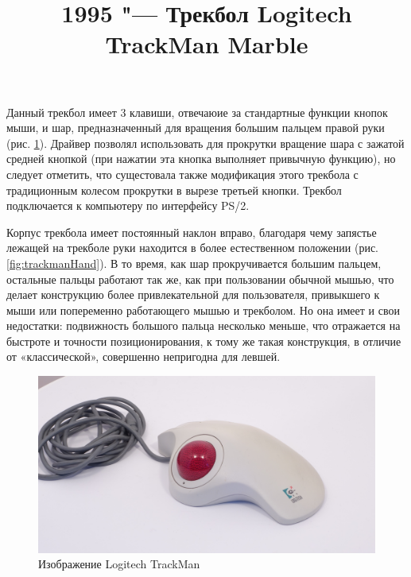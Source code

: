 \documentclass[11pt, a4paper]{article}
\begin{document}
\title{1995 "--- Трекбол Logitech TrackMan Marble}
\date{}
\maketitle

Данный трекбол имеет 3 клавиши, отвечаюие за стандартные функции кнопок мыши, и шар, предназначенный для вращения большим пальцем правой руки (рис. \ref{fig:trackman}). Драйвер позволял использовать для прокрутки вращение шара с зажатой средней кнопкой (при нажатии эта кнопка выполняет привычную функцию), но следует отметить, что сущестовала также модификация этого трекбола с традиционным колесом прокрутки в вырезе третьей кнопки.
Трекбол подключается к компьютеру по интерфейсу PS/2.

Корпус трекбола имеет постоянный наклон вправо, благодаря чему запястье лежащей на трекболе руки находится в более естественном положении (рис. \ref{fig:trackmanHand}). В то время, как шар прокручивается большим пальцем, остальные пальцы работают так же, как при пользовании обычной мышью, что делает конструкцию более привлекательной для пользователя, привыкшего к мыши или попеременно работающего мышью и трекболом. Но она имеет и свои недостатки: подвижность большого пальца несколько меньше, что отражается на быстроте и точности позиционирования, к тому же такая конструкция, в отличие от «классической», совершенно непригодна для левшей.

\begin{figure}[h]
    \centering
    \includegraphics[scale=0.3]{1995_logitech_trackman/2.15.JPG}
    \caption{Изображение Logitech TrackMan}
    \label{fig:trackman}
\end{figure}
\end{document}
